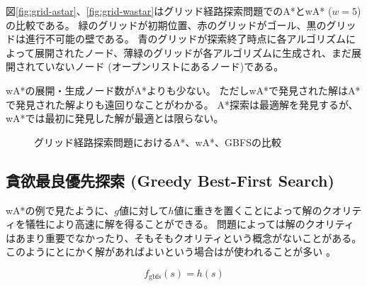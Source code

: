 図\ref{fig:grid-astar}、\ref{fig:grid-wastar}はグリッド経路探索問題でのA*とwA* ($w=5$)の比較である。
緑のグリッドが初期位置、赤のグリッドがゴール、黒のグリッドは進行不可能の壁である。
青のグリッドが探索終了時点に各アルゴリズムによって展開されたノード、薄緑のグリッドが各アルゴリズムに生成され、まだ展開されていないノード (オープンリストにあるノード)である。

wA*の展開・生成ノード数がA*よりも少ない。
ただしwA*で発見された解はA*で発見された解よりも遠回りなことがわかる。
A*探索は最適解を発見するが、wA*では最初に発見した解が最適とは限らない。

\begin{figure}
  \centering
   \hspace{4pt}
   \hspace{4pt}
  \caption{グリッド経路探索問題におけるA*、wA*、GBFSの比較}
  \label{fig:grid-comparison}
\end{figure}

\subsection{貪欲最良優先探索 (Greedy Best-First Search)}
\label{sec:greedy-best-first-search}

wA*の例で見たように、$g$値に対して$h$値に重きを置くことによって解のクオリティを犠牲により高速に解を得ることができる。
問題によっては解のクオリティはあまり重要でなかったり、そもそもクオリティという概念がないことがある。
このようにとにかく解があればよいという場合はが使われることが多い \cite{wilt2010comparison}。

\begin{equation}
  f_{\text{gbfs}}(s) = h(s)
\end{equation}

